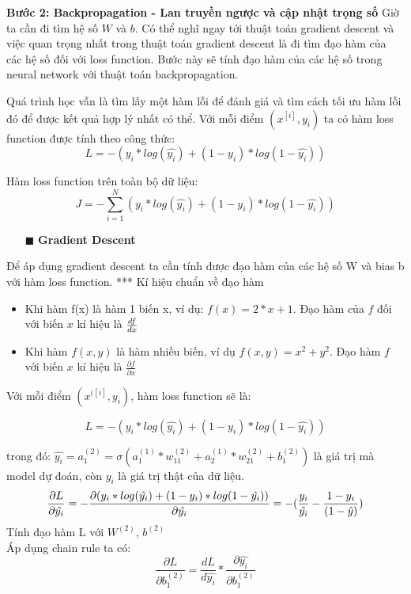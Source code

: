 \textbf{Bước 2: Backpropagation - Lan truyền ngược và cập nhật trọng số}
Giờ ta cần đi tìm hệ số $W$ và $b$. Có thể nghĩ ngay tới thuật toán gradient descent và việc quan trọng nhất trong thuật toán gradient descent là đi tìm đạo hàm của các hệ số đối với loss function. Bước này sẽ tính đạo hàm của các hệ số trong neural network với thuật toán backpropagation.

Quá trình học vẫn là tìm lấy một hàm lỗi để đánh giá và tìm cách tối ưu hàm lỗi đó để được kết quả hợp lý nhất có thể. Với mỗi điểm $(x^{[i]}, y_i)$ ta có hàm loss function được tính theo công thức: $$L = -(y_i * log(\hat{y_i}) + (1 - y_i) * log(1 - \hat{y_i}))$$

Hàm loss function trên toàn bộ dữ liệu:
$$J = - \sum_{i=1}^{N}(y_i * log(\hat{y_i}) + (1 - y_i) * log(1 - \hat{y_i}))$$

\begin{itemize}
\item[$\blacksquare$] \textbf{Gradient Descent}
\end{itemize}
Để áp dụng gradient descent ta cần tính được đạo hàm của các hệ số W và bias b với hàm loss function.
*** Kí hiệu chuẩn về đạo hàm
\begin{itemize}
\item Khi hàm f(x) là hàm 1 biến x, ví dụ: $ f(x) = 2*x + 1$. Đạo hàm của $f$ đối với biến $x$ kí hiệu là $\frac{df}{dx}\newline $
\item Khi hàm $f(x, y)$ là hàm nhiều biến, ví dụ $ f(x, y) = x^2 + y^2$. Đạo hàm $f$ với biến $x$ kí hiệu là $ \frac{\partial f}{\partial x}$
\end{itemize}

Với mỗi điểm $(x^{([i]}, y_i)$, hàm loss function sẽ là:

$$L = -(y_i * log(\hat{y_i}) + (1 - y_i) * log(1 - \hat{y_i}))$$


trong đó: $\hat{y_i} = a_1^{(2)} = \sigma(a_1^{(1)} * w_{11}^{(2)} + a_2^{(1)} * w_{21}^{(2)} + b_1^{(2)})$
 là giá trị mà model dự đoán, còn $y_i$ là giá trị thật của dữ liệu.
$$\frac{\partial L}{\partial\hat{y_i}} = - \frac{\partial(y_i * log(\hat{y_i}) + (1 - y_i) * log(1 - \hat{y_i}))}{\partial\hat{y_i}}= - (\frac{y_i}{\hat{y_i}} - \frac{1-y_i}{(1-\hat{y})})\newline$$
Tính đạo hàm L với $W^{(2)}$, $b^{(2)}$\\
Áp dụng chain rule ta có: $$ \frac{\partial L}{\partial b_1^{(2)}} = \frac{dL}{d\hat{y_i}} * \frac{\partial\hat{y_i}}{\partial b_1^{(2)} } $$

